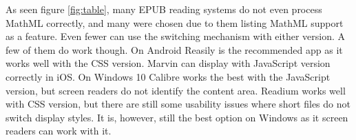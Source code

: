 As seen figure \ref{fig:table}, many EPUB reading systems do not even process MathML correctly, and many were chosen due to them listing MathML support as a feature. Even fewer can use the switching mechanism with either version. A few of them do work though. On Android Reasily is the recommended app as it works well with the CSS version. Marvin can display with JavaScript version correctly in iOS. On Windows 10 Calibre works the best with the JavaScript version, but screen readers do not identify the content area. Readium works well with CSS version, but there are still some usability issues where short files do not switch display styles. It is, however, still the best option on Windows as it screen readers can work with it.